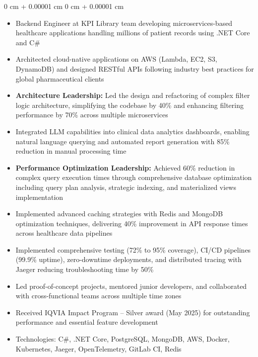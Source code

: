 \documentclass[10pt, letterpaper]{article}
\newenvironment{highlights}{
    \begin{itemize}[
        topsep=0.10 cm,
        parsep=0.10 cm,
        partopsep=0pt,
        itemsep=0pt,
        leftmargin=0 cm + 10pt
    ]
}{
    \end{itemize}
} %
\newenvironment{onecolentry}{
    \begin{adjustwidth}{
        0 cm + 0.00001 cm
    }{
        0 cm + 0.00001 cm
    }
}{
    \end{adjustwidth}
} %
\begin{document}
        \vspace{0.10 cm}
        \begin{onecolentry}
            \begin{highlights}
                \item Backend Engineer at KPI Library team developing microservices-based healthcare applications handling millions of patient records using .NET Core and C\#
                \item Architected cloud-native applications on AWS (Lambda, EC2, S3, DynamoDB) and designed RESTful APIs following industry best practices for global pharmaceutical clients
                \item \textbf{Architecture Leadership:} Led the design and refactoring of complex filter logic architecture, simplifying the codebase by 40\% and enhancing filtering performance by 70\% across multiple microservices
                \item Integrated LLM capabilities into clinical data analytics dashboards, enabling natural language querying and automated report generation with 85\% reduction in manual processing time
                \item \textbf{Performance Optimization Leadership:} Achieved 60\% reduction in complex query execution times through comprehensive database optimization including query plan analysis, strategic indexing, and materialized views implementation
                \item Implemented advanced caching strategies with Redis and MongoDB optimization techniques, delivering 40\% improvement in API response times across healthcare data pipelines
                \item Implemented comprehensive testing (72\% to 95\% coverage), CI/CD pipelines (99.9\% uptime), zero-downtime deployments, and distributed tracing with Jaeger reducing troubleshooting time by 50\%
                \item Led proof-of-concept projects, mentored junior developers, and collaborated with cross-functional teams across multiple time zones
                \item Received IQVIA Impact Program – Silver award (May 2025) for outstanding performance and essential feature development
                \item Technologies: C\#, .NET Core, PostgreSQL, MongoDB, AWS, Docker, Kubernetes, Jaeger, OpenTelemetry, GitLab CI, Redis
            \end{highlights}
        \end{onecolentry}
\end{document}

